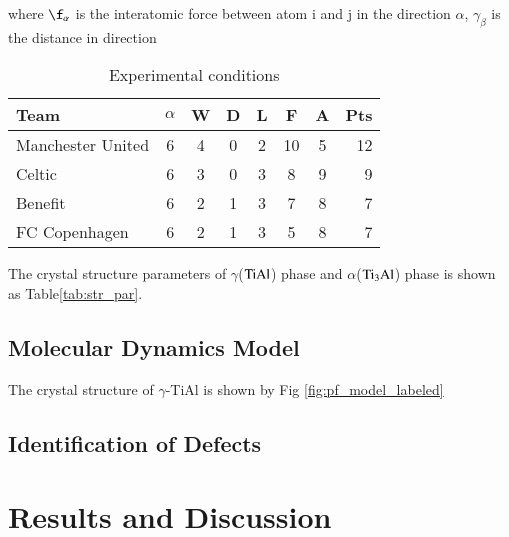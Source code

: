 \documentclass[final,5p,times,twocolumn]{elsarticle}
\begin{document}
where $\f_\alpha$ is the interatomic force between atom i and j in the direction $\alpha$, $\gamma_\beta$ is the distance in direction 
\begin{table}[H]
\centering
\caption{Experimental conditions}
\begin{tabular}{l*{6}{c}r}	
		\hline
		Team              & $\alpha$ & W & D & L & F  & A & Pts \\
		\hline
		Manchester United & 6 & 4 & 0 & 2 & 10 & 5 & 12  \\
		Celtic            & 6 & 3 & 0 & 3 &  8 & 9 &  9  \\
		Benefit           & 6 & 2 & 1 & 3 &  7 & 8 &  7  \\
		FC Copenhagen     & 6 & 2 & 1 & 3 &  5 & 8 &  7  \\
		\hline
\end{tabular}
\label{Tab:par}
\end{table}
The crystal structure parameters of $\gamma$($\rm TiAl$) phase and $\alpha$($\rm Ti_3Al$) phase is shown as Table\ref{tab:str_par}. 
\subsection{Molecular Dynamics Model}
The crystal structure of $\gamma$-TiAl
is shown by Fig \ref{fig:pf_model_labeled}
\subsection{Identification of Defects}
\section{Results and Discussion}
\end{document}
